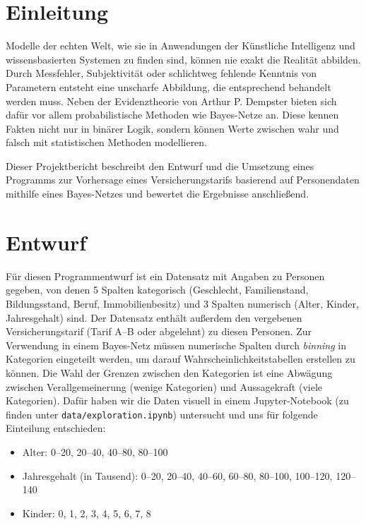 \section{Einleitung}
Modelle der echten Welt, wie sie in Anwendungen der Künstliche Intelligenz und wissensbasierten Systemen zu finden sind, können nie exakt die Realität abbilden. Durch Messfehler, Subjektivität oder schlichtweg fehlende Kenntnis von Parametern entsteht eine unscharfe Abbildung, die entsprechend behandelt werden muss. Neben der Evidenztheorie von Arthur P. Dempster bieten sich dafür vor allem probabilistische Methoden wie Bayes-Netze an. Diese kennen Fakten nicht nur in binärer Logik, sondern können Werte zwischen wahr und falsch mit statistischen Methoden modellieren.

Dieser Projektbericht beschreibt den Entwurf und die Umsetzung eines Programms zur Vorhersage eines Versicherungstarifs basierend auf Personendaten mithilfe eines Bayes-Netzes und bewertet die Ergebnisse anschließend.


\section{Entwurf}
Für diesen Programmentwurf ist ein Datensatz mit Angaben zu Personen gegeben, von denen 5 Spalten kategorisch (Geschlecht, Familienstand, Bildungsstand, Beruf, Immobilienbesitz) und 3 Spalten numerisch (Alter, Kinder, Jahresgehalt) sind. Der Datensatz enthält außerdem den vergebenen Versicherungstarif (Tarif A--B oder abgelehnt) zu diesen Personen. Zur Verwendung in einem Bayes-Netz müssen numerische Spalten durch \textit{binning} in Kategorien eingeteilt werden, um darauf Wahrscheinlichkeitstabellen erstellen zu können. Die Wahl der Grenzen zwischen den Kategorien ist eine Abwägung zwischen Verallgemeinerung (wenige Kategorien) und Aussagekraft (viele Kategorien). Dafür haben wir die Daten visuell in einem Jupyter-Notebook (zu finden unter \texttt{data/exploration.ipynb}) untersucht und uns für folgende Einteilung entschieden:
\begin{itemize}
    \item Alter: 0--20, 20--40, 40--80, 80--100
    \item Jahresgehalt (in Tausend): 0--20, 20--40, 40--60, 60--80, 80--100, 100--120, 120--140
    \item Kinder: 0, 1, 2, 3, 4, 5, 6, 7, 8
\end{itemize}

